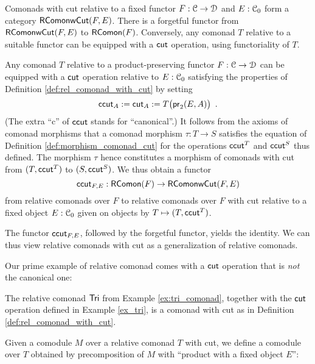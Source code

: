 \documentclass[a4paper,USenglish]{lipics}
\begin{document}
Comonads with cut relative to a fixed functor $F:{\mathcal{C}}\to\mathcal{D}$ and $E:{\mathcal{C}}_0$ form a category $\mathsf{\mathsf{RComon} wCut}(F,E)$.
There is a forgetful functor from $\mathsf{\mathsf{RComon} wCut}(F,E)$ to $\mathsf{RComon}(F)$.
Conversely, any comonad $T$ relative to a suitable functor can be equipped with a $\mathsf{cut}$ operation, using functoriality of $T$.
%

\begin{rem}\label{canonical_cut}
 Any comonad $T$ relative to a product-preserving functor $F:{\mathcal{C}}\to\mathcal{D}$  can be equipped with a $\mathsf{cut}$ operation relative to 
 $E:{\mathcal{C}}_0$ satisfying the properties of Definition \ref{def:rel_comonad_with_cut} by setting
   \[ \mathsf{ccut}_A := \mathsf{cut}_A := T\bigl(\mathsf{pr}_2(E,A)\bigr) \enspace . \]
 (The extra \enquote{c} of $\mathsf{ccut}$ stands for \enquote{canonical}.)
 It follows from the axioms of comonad morphisms that a comonad morphism $\tau : T\to S$ satisfies the equation of Definition \ref{def:morphism_comonad_cut} 
 for the  operations $\mathsf{ccut}^T$ and $\mathsf{ccut}^S$ thus defined. The morphism $\tau$ hence constitutes a morphism of comonads with cut from $(T,\mathsf{ccut}^T)$ to $(S,\mathsf{ccut}^S)$.
 We thus obtain a functor 
 \[ \mathsf{ccut}_{F,E} : \mathsf{RComon}(F) \to \mathsf{\mathsf{RComon} wCut}(F,E)\]
 from relative comonads over $F$ to relative comonads over $F$ with cut relative to a fixed object $E:{\mathcal{C}}_0$ given on 
 objects by $T\mapsto (T,\mathsf{ccut}^T)$.
\end{rem}

The functor $\mathsf{ccut}_{F,E}$, followed by the forgetful functor, yields the identity. We can thus view
relative comonads with cut as a generalization of relative comonads.

Our prime example of relative comonad comes with a $\mathsf{cut}$ operation that is \emph{not} the canonical one:

\begin{example}%
\label{def:cut_for_tri}
  The relative comonad $\mathsf{Tri}$ from Example \ref{ex:tri_comonad}, together with the $\mathsf{cut}$ operation defined in Example \ref{ex_tri}, 
  is a comonad with cut as in Definition \ref{def:rel_comonad_with_cut}.
\end{example}





Given a comodule $M$ over a relative comonad $T$ with cut, we define a comodule over $T$ obtained by precomposition of $M$ with
\enquote{product with a fixed object $E$}:
\end{document}
